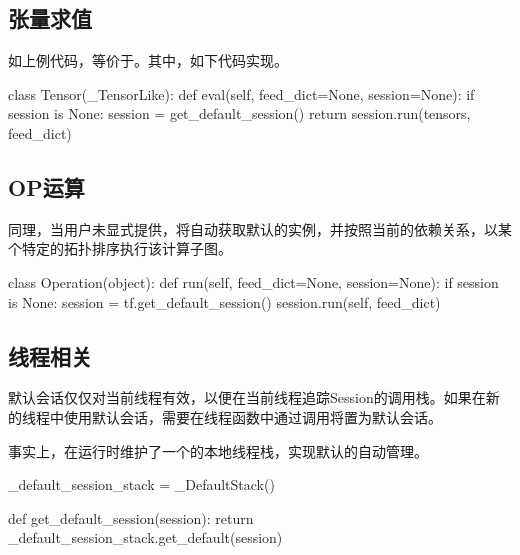 \begin{content}
\begin{content}
\subsection{张量求值}

如上例代码，等价于。其中，如下代码实现。

\begin{leftbar}
\begin{python}
class Tensor(_TensorLike):
  def eval(self, feed_dict=None, session=None):
    if session is None:
      session = get_default_session()
    return session.run(tensors, feed_dict)
\end{python}
\end{leftbar}

\subsection{OP运算}

同理，当用户未显式提供，将自动获取默认的实例，并按照当前的依赖关系，以某个特定的拓扑排序执行该计算子图。

\begin{leftbar}
\begin{python}
class Operation(object):
  def run(self, feed_dict=None, session=None):
    if session is None:
      session = tf.get_default_session()
    session.run(self, feed_dict)
\end{python}
\end{leftbar}

\subsection{线程相关}

默认会话仅仅对当前线程有效，以便在当前线程追踪Session的调用栈。如果在新的线程中使用默认会话，需要在线程函数中通过调用将置为默认会话。

事实上，在运行时维护了一个的本地线程栈，实现默认的自动管理。

\begin{leftbar}
\begin{python}
_default_session_stack = _DefaultStack()

def get_default_session(session):
  return _default_session_stack.get_default(session)
\end{python}
\end{leftbar}


\end{content}
\end{content}
